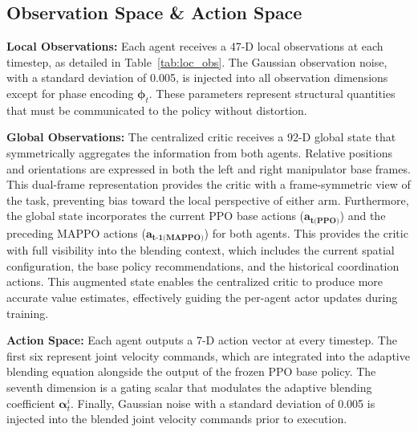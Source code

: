 \documentclass[a4paper,fleqn]{cas-dc}
\begin{document}
\subsection{Observation Space \& Action Space}
\label{observation_space_action}
\textbf{Local Observations:}
Each agent receives a 47-D local observations at each timestep, as detailed in Table~\ref{tab:loc_obs}. The Gaussian observation noise, with a standard deviation of 0.005, is injected into all observation dimensions except for phase encoding $\mathbf{\phi}_{t}$. These parameters represent structural quantities that must be communicated to the policy without distortion. 

\textbf{Global Observations:}
The centralized critic receives a 92-D global state that symmetrically aggregates the information from both agents. Relative positions and orientations are expressed in both the left and right manipulator base frames. This dual-frame representation provides the critic with a frame-symmetric view of the task, preventing bias toward the local perspective of either arm. Furthermore, the global state incorporates the current PPO base actions ($\mathbf{a_{\text{t(PPO)}}}$) and the preceding MAPPO actions ($\mathbf{a_{\text{t-1(MAPPO)}}}$) for both agents. This provides the critic with full visibility into the blending context, which includes the current spatial configuration, the base policy recommendations, and the historical coordination actions. This augmented state enables the centralized critic to produce more accurate value estimates, effectively guiding the per-agent actor updates during training.

\textbf{Action Space:}
Each agent outputs a 7-D action vector at every timestep. The first six represent joint velocity commands, which are integrated into the adaptive blending equation alongside the output of the frozen PPO base policy. The seventh dimension is a gating scalar that modulates the adaptive blending coefficient $\mathbf{\alpha}^{i}_{t}$. Finally, Gaussian noise with a standard deviation of 0.005 is injected into the blended joint velocity commands prior to execution.
\end{document}
